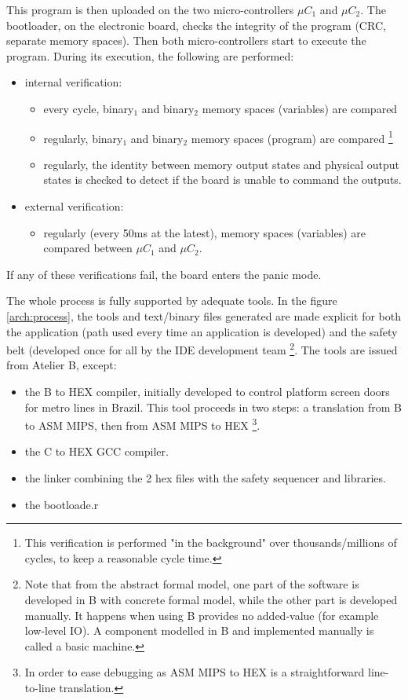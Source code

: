 This program is then uploaded on the two micro-controllers $\mu C_1$ and $\mu C_2$. The bootloader, on the electronic board, checks the integrity of the program (CRC, separate memory spaces). Then both micro-controllers start to execute the program. During its execution, the following are performed:
\begin{itemize}
    \item internal verification:
\begin{itemize}
    \item every cycle, binary$_1$ and binary$_2$ memory spaces (variables) are compared
    \item regularly, binary$_1$ and binary$_2$ memory spaces (program) are compared \footnote{This verification is performed "in the background" over thousands/millions of cycles, to keep a reasonable cycle time.}
    \item regularly, the identity between memory output states and physical output states is checked to detect if the board is unable to command the outputs.
\end{itemize} 
\item external verification:
\begin{itemize}
    \item regularly (every 50ms at the latest), memory spaces (variables) are compared between $\mu C_1$ and $\mu C_2$. 
\end{itemize} 
\end{itemize} 
If any of these verifications fail, the board enters the panic mode.

The whole process is fully supported by adequate tools. In the figure \ref{arch:process}, the tools and text/binary files generated are made explicit for both the application (path used every time an application is developed) and the safety belt (developed once for all by the IDE development team \footnote{Note that from the abstract formal model, one part of the software is developed in B with concrete formal model, while the other part is developed manually. It happens when using B provides no added-value (for example low-level IO). A component modelled in B and implemented manually is called a basic machine.}. The tools are issued from Atelier B, except:
\begin{itemize}
    \item the B to HEX compiler, initially developed to control platform screen doors for metro lines in Brazil. This tool proceeds in two steps: a translation from B to ASM MIPS, then from ASM MIPS to HEX \footnote{In order to ease debugging as ASM MIPS to HEX is a straightforward line-to-line translation.}.
    \item the C to HEX GCC compiler.
    \item the linker combining the 2 hex files with the safety sequencer and libraries.
    \item the bootloade.r\\
\end{itemize}



